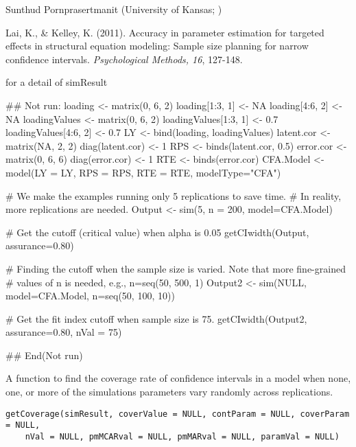 \documentclass[a4paper]{book}
\begin{document}
%
\begin{Author}\relax
Sunthud Pornprasertmanit (University of Kansas; )
\end{Author}
%
\begin{References}\relax
Lai, K., \& Kelley, K. (2011). Accuracy in parameter estimation for targeted effects in structural equation modeling: Sample size planning for narrow confidence intervals. \emph{Psychological Methods, 16}, 127-148.
\end{References}
%
\begin{SeeAlso}\relax
{} for a detail of simResult
\end{SeeAlso}
%
\begin{Examples}
\begin{ExampleCode}
## Not run: 
loading <- matrix(0, 6, 2)
loading[1:3, 1] <- NA
loading[4:6, 2] <- NA
loadingValues <- matrix(0, 6, 2)
loadingValues[1:3, 1] <- 0.7
loadingValues[4:6, 2] <- 0.7
LY <- bind(loading, loadingValues)
latent.cor <- matrix(NA, 2, 2)
diag(latent.cor) <- 1
RPS <- binds(latent.cor, 0.5)
error.cor <- matrix(0, 6, 6)
diag(error.cor) <- 1
RTE <- binds(error.cor)
CFA.Model <- model(LY = LY, RPS = RPS, RTE = RTE, modelType="CFA")

# We make the examples running only 5 replications to save time.
# In reality, more replications are needed.
Output <- sim(5, n = 200, model=CFA.Model)

# Get the cutoff (critical value) when alpha is 0.05
getCIwidth(Output, assurance=0.80)

# Finding the cutoff when the sample size is varied. Note that more fine-grained 
# values of n is needed, e.g., n=seq(50, 500, 1)
Output2 <- sim(NULL, model=CFA.Model, n=seq(50, 100, 10))

# Get the fit index cutoff when sample size is 75.
getCIwidth(Output2, assurance=0.80, nVal = 75)

## End(Not run)
\end{ExampleCode}
\end{Examples}
%
\begin{Description}\relax
A function to find the coverage rate of confidence intervals in a model when none, one, or more of the simulations parameters vary randomly across replications.
\end{Description}
%
\begin{Usage}
\begin{verbatim}
getCoverage(simResult, coverValue = NULL, contParam = NULL, coverParam = NULL, 
    nVal = NULL, pmMCARval = NULL, pmMARval = NULL, paramVal = NULL)
\end{verbatim}
\end{Usage}
\end{document}

